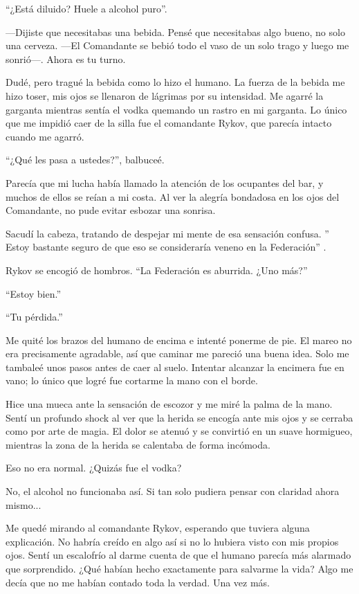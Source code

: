 ``¿Está diluido? Huele a alcohol puro''.

—Dijiste que necesitabas una bebida. Pensé que necesitabas algo bueno, no solo una cerveza. —El Comandante se bebió todo el vaso de un solo trago y luego me sonrió—. Ahora es tu turno.

Dudé, pero tragué la bebida como lo hizo el humano. La fuerza de la bebida me hizo toser, mis ojos se llenaron de lágrimas por su intensidad. Me agarré la garganta mientras sentía el vodka quemando un rastro en mi garganta. Lo único que me impidió caer de la silla fue el comandante Rykov, que parecía intacto cuando me agarró.

``¿Qué les pasa a ustedes?'', balbuceé.

Parecía que mi lucha había llamado la atención de los ocupantes del bar, y muchos de ellos se reían a mi costa. Al ver la alegría bondadosa en los ojos del Comandante, no pude evitar esbozar una sonrisa.

Sacudí la cabeza, tratando de despejar mi mente de esa sensación confusa. ''
Estoy bastante seguro de que eso se consideraría veneno en la Federación''
.

Rykov se encogió de hombros. ``La Federación es aburrida. ¿Uno más?''


``Estoy bien.''


``Tu pérdida.''


Me quité los brazos del humano de encima e intenté ponerme de pie. El mareo no era precisamente agradable, así que caminar me pareció una buena idea. Solo me tambaleé unos pasos antes de caer al suelo. Intentar alcanzar la encimera fue en vano; lo único que logré fue cortarme la mano con el borde.

Hice una mueca ante la sensación de escozor y me miré la palma de la mano. Sentí un profundo shock al ver que la herida se encogía ante mis ojos y se cerraba como por arte de magia. El dolor se atenuó y se convirtió en un suave hormigueo, mientras la zona de la herida se calentaba de forma incómoda.

Eso no era normal. ¿Quizás fue el vodka?

No, el alcohol no funcionaba así. Si tan solo pudiera pensar con claridad ahora mismo...

Me quedé mirando al comandante Rykov, esperando que tuviera alguna explicación. No habría creído en algo así si no lo hubiera visto con mis propios ojos. Sentí un escalofrío al darme cuenta de que el humano parecía más alarmado que sorprendido. ¿Qué habían hecho exactamente para salvarme la vida? Algo me decía que no me habían contado toda la verdad. Una vez más.

